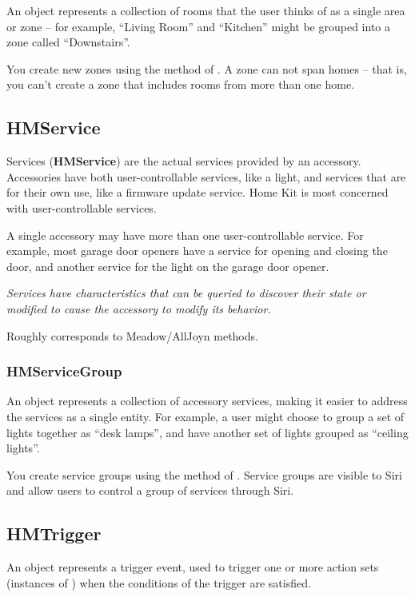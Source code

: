 \documentclass{myproc}
\begin{document}
 An  object represents a collection of rooms that the user thinks
 of as  a single area or zone -- for example, ``Living Room'' and ``Kitchen''
 might be  grouped into a zone called ``Downstairs''. 

You create new zones using the  method of
. A zone can not span homes -- that is, you can’t create a zone
that includes rooms from more than one home. 


\subsection{HMService}
\textcolor{blue2}{Services (\textbf{HMService}) are the actual services provided by an accessory. Accessories have both user-controllable services, like a light, and services that are for their own use, like a firmware update service. Home Kit is most concerned with user-controllable services.}

A single accessory may have more than one user-controllable service. For example, most garage door openers have a service for opening and closing the door, and another service for the light on the garage door opener. 

{\em Services have
characteristics that can be queried to discover their state or modified to
cause the accessory to modify its behavior. \/}

\textcolor{red2}{Roughly corresponds to Meadow/AllJoyn methods}.

\subsubsection{HMServiceGroup}
An  object represents a collection of accessory services,
making it easier to address the services as a single entity. For example, a user
might choose to group a set of lights together as ``desk lamps'', and have
another set of lights grouped as ``ceiling lights''.  

You create service groups using the
 method of . Service
  groups are visible to Siri and allow users to control a group of services
  through Siri. 

\subsection{HMTrigger}
An  object represents a trigger event, used to trigger one or
more action sets (instances of ) when the conditions of the
trigger are satisfied. 
\end{document}
